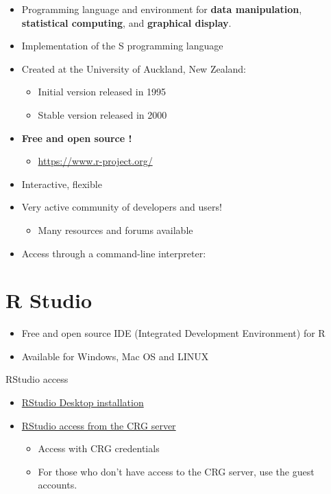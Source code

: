 \documentclass[]{book}
\providecommand{\tightlist}{%
  \setlength{\itemsep}{0pt}\setlength{\parskip}{0pt}}
\begin{document}
\begin{itemize}
\item
  Programming language and environment for \textbf{data manipulation},
  \textbf{statistical computing}, and \textbf{graphical display}.
\item
  Implementation of the S programming language
\item
  Created at the University of Auckland, New Zealand:

  \begin{itemize}
  \tightlist
  \item
    Initial version released in 1995
  \item
    Stable version released in 2000
  \end{itemize}
\item
  \textbf{Free and open source !}

  \begin{itemize}
  \tightlist
  \item
    \url{https://www.r-project.org/}
  \end{itemize}
\item
  Interactive, flexible
\item
  Very active community of developers and users!

  \begin{itemize}
  \tightlist
  \item
    Many resources and forums available
  \end{itemize}
\item
  Access through a command-line interpreter:
\end{itemize}

\chapter{R Studio}\label{r-studio}

\begin{itemize}
\item
  Free and open source IDE (Integrated Development Environment) for R
\item
  Available for Windows, Mac OS and LINUX
\end{itemize}

RStudio access

\begin{itemize}
\item
  \href{https://www.rstudio.com/products/rstudio/download}{RStudio
  Desktop installation}
\item
  \href{http://rstudio.linux.crg.es/}{RStudio access from the CRG
  server}

  \begin{itemize}
  \tightlist
  \item
    Access with CRG credentials
  \item
    For those who don't have access to the CRG server, use the guest
    accounts.
  \end{itemize}
\end{itemize}
\end{document}
